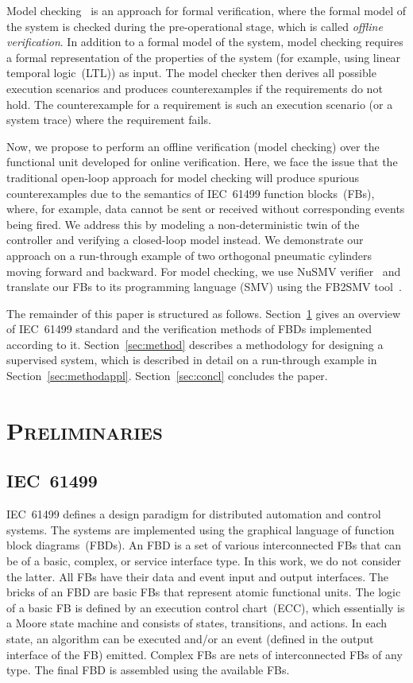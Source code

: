 \begin{bibunit}
Model checking~\cite{clarke1999} is an approach for formal verification, where the formal model of the system is checked during the pre-operational stage, which is called \emph{offline verification}. In addition to a formal model of the system, model checking requires a formal representation of the properties of the system (for example, using linear temporal logic~(LTL)) as input. The model checker then derives all possible execution scenarios and produces counterexamples if the requirements do not hold. The counterexample for a requirement is such an execution scenario (or a system trace) where the requirement fails. 

Now, we propose to perform an offline verification (model checking) over the functional unit developed for online verification. Here, we face the issue that the traditional open-loop approach for model checking will produce spurious counterexamples due to the semantics of IEC~61499 function blocks~(FBs), where, for example, data cannot be sent or received without corresponding events being fired. 
We address this by modeling a non-deterministic twin of the controller and verifying a closed-loop model instead. We demonstrate our approach on a run-through example of two orthogonal pneumatic cylinders moving forward and backward. For model checking, we use NuSMV verifier~\cite{nusmv} and translate our FBs to its programming language (SMV) using the FB2SMV tool~\cite{drozdov2015fb2smv}.

The remainder of this paper is structured as follows. Section~\ref{sec:prelim} gives an overview of IEC~61499 standard and the verification methods of FBDs implemented according to it. Section~\ref{sec:method} describes a methodology for designing a supervised system, which is described in detail on a run-through example in Section~\ref{sec:methodappl}. Section~\ref{sec:concl} concludes the paper.

\section{\textsc{Preliminaries}}
\label{sec:prelim}
\subsection{IEC~61499}
IEC~61499 defines a design paradigm for distributed automation and control systems. The systems are implemented using the graphical language of function block diagrams~(FBDs). An FBD is a set of various interconnected FBs that can be of a basic, complex, or service interface type. In this work, we do not consider the latter. All FBs have their data and event input and output interfaces. The bricks of an FBD are basic FBs that represent atomic functional units. The logic of a basic FB is defined by an execution control chart~(ECC), which essentially is a Moore state machine and consists of states, transitions, and actions. In each state, an algorithm can be executed and/or an event (defined in the output interface of the FB) emitted. Complex FBs are nets of interconnected FBs of any type. The final FBD is assembled using the available FBs.


\end{bibunit}
